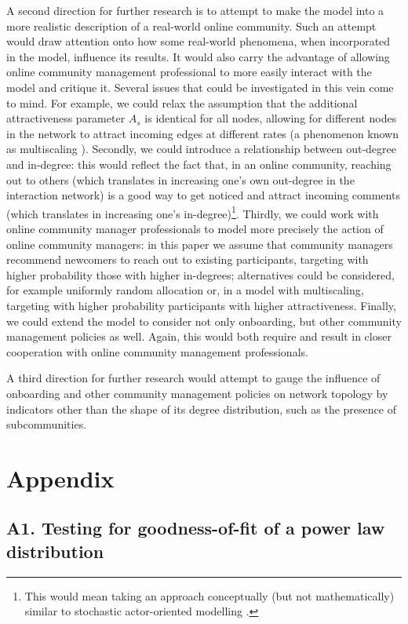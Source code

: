 \documentclass{article}
\begin{document}
A second direction for further research is to attempt to make the model into a more realistic description of a real-world online community. Such an attempt would draw attention onto how some real-world phenomena, when incorporated in the model, influence its results. It would also carry the advantage of allowing online community management professional to more easily interact with the model and critique it. Several issues that could be investigated in this vein come to mind. For example, we could relax the assumption that the additional attractiveness parameter $A_s$ is identical for all nodes, allowing for different nodes in the network to attract incoming edges at different rates (a phenomenon known as multiscaling \cite{bianconi2001competition}). Secondly, we could introduce a relationship between out-degree and in-degree: this would reflect the fact that, in an online community, reaching out to others (which translates in increasing one's own out-degree in the interaction network) is a good way to get noticed and attract incoming comments (which translates in increasing one's in-degree)\footnote{This would mean taking an approach conceptually (but not mathematically) similar to stochastic actor-oriented modelling \cite{snijders1996stochastic}.}. Thirdly, we could work with online community manager professionals to model more precisely the action of online community managers: in this paper we assume that community managers recommend newcomers to reach out to existing participants, targeting with higher probability those with higher in-degrees; alternatives could be considered, for example uniformly random allocation or, in a model with multiscaling, targeting with higher probability participants with higher attractiveness. Finally, we could extend the model to consider not only onboarding, but other community management policies as well. Again, this would both require and result in closer cooperation with online community management professionals.

A third direction for further research would attempt to gauge the influence of onboarding and other community management policies on network topology by indicators other than the shape of its degree distribution, such as the presence of subcommunities. 



\section{Appendix}
\subsection{A1. Testing for goodness-of-fit of a power law distribution}
\end{document}
